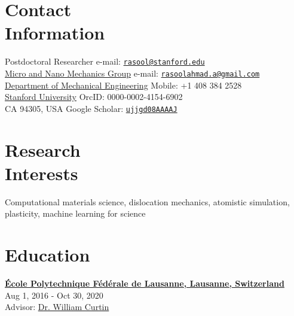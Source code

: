 \documentclass[margin,line]{resume}
\begin{document}
\renewcommand{\thefootnote}{\fnsymbol{footnote}}
\begin{resume}

    \section{\mysidestyle Contact\\Information}
    Postdoctoral Researcher		\hfill e-mail: {\href{mailto:rasool@stanford.edu}{\nolinkurl{rasool@stanford.edu}}} \\
    \href{https://micronano.stanford.edu/}{Micro and Nano Mechanics Group} \hfill e-mail: {\href{mailto:rasoolahmad.a@gmail.com}{\nolinkurl{rasoolahmad.a@gmail.com}}} \\
    \href{https://me.stanford.edu/}{Department of Mechanical Engineering} \hfill Mobile: +1 408 384 2528 \\
    \href{https://www.stanford.edu/}{Stanford University} \hfill OrcID:  0000-0002-4154-6902 \\
    CA 94305, USA  \hfill Google Scholar: {\href{https://scholar.google.ch/citations?user=ujjgd08AAAAJ&hl=en}{\nolinkurl{ujjgd08AAAAJ}}}




    \section{\mysidestyle Research\\Interests}

    Computational materials science, dislocation mechanics, atomistic simulation, plasticity, machine learning for science

    \section{\mysidestyle Education}

    \textbf{\href{https://www.epfl.ch/en/}{\textsf{\'Ecole Polytechnique F\'ed\'erale de Lausanne, Lausanne,
                Switzerland} }} \\
     \hfill \small{Aug 1, 2016 - Oct 30, 2020} \\
    Advisor:  \href{https://people.epfl.ch//william.curtin?lang=en}{Dr. William Curtin}


\end{resume}
\end{document}
